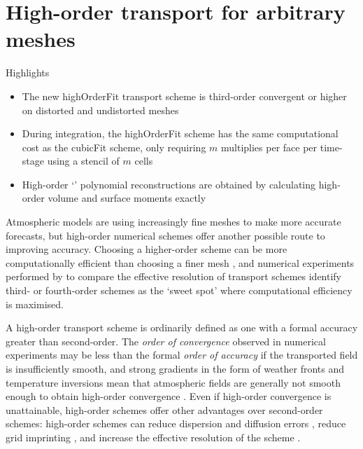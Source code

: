 \chapter{High-order transport for arbitrary meshes}
\label{ch:highOrder}

\begin{highlights}
{\Large Highlights}
\begin{itemize}
	\item The new highOrderFit transport scheme is third-order convergent or higher on distorted and undistorted meshes
	\item During integration, the highOrderFit scheme has the same computational cost as the cubicFit scheme, only requiring $m$ multiplies per face per time-stage using a stencil of $m$ cells
	\item High-order `\kexact' polynomial reconstructions are obtained by calculating high-order volume and surface moments exactly
\end{itemize}
\end{highlights}

Atmospheric models are using increasingly fine meshes to make more accurate forecasts, but high-order numerical schemes offer another possible route to improving accuracy.
Choosing a higher-order scheme can be more computationally efficient than choosing a finer mesh \citep{waruszewski2018}, and numerical experiments performed by \citet{ullrich2014} to compare the effective resolution of transport schemes identify third- or fourth-order schemes as the `sweet spot' where computational efficiency is maximised.

A high-order transport scheme is ordinarily defined as one with a formal accuracy greater than second-order.
The \emph{order of convergence} observed in numerical experiments may be less than the formal \emph{order of accuracy} if the transported field is insufficiently smooth, and strong gradients in the form of weather fronts and temperature inversions mean that atmospheric fields are generally not smooth enough to obtain high-order convergence \citep{holdaway2008}.
Even if high-order convergence is unattainable, high-order schemes offer other advantages over second-order schemes: high-order schemes can reduce dispersion and diffusion errors \citep{ullrich-jablonowski2012,waruszewski2018}, reduce grid imprinting \citep{mccorquodale2015}, and increase the effective resolution of the scheme \citep{ullrich2014}.

